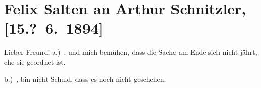 

\renewcommand{\erwaehntePersonen}{Personen: Felix Dörmann, Adele Sandrock, Johanna Simonetta Sandrock}
\renewcommand{\erwaehnteOrte}{Orte: Café Arkaden, Riedhof, Volkstheater, Wien}
\renewcommand{\erwaehnteWerke}{Werke: Anfang vom Ende, Neue Deutsche Rundschau, Therese Krones. Genrebild mit Gesang und Tanz in drei Akten}
\section[Felix Salten an Arthur Schnitzler, {[}15.? 6. 1894{]}]{Felix Salten an Arthur Schnitzler, {[}15.? 6. 1894{]}}
\nopagebreak{}
\rehead{ }\normalsize\beginnumbering{}
\toendnotes[C]{\smallbreak\pagebreak[2]}
\toendnotes[C]{\smallbreak}
\pstart{}{\pb}Lieber Freund!\pend
\pstart
           a.) \label{K_L03138-1v}\label{K_L03138-1h}, und mich bemühen, dass
               die Sache am Ende sich nicht jährt, ehe sie geordnet ist.\pend
           
\pstart
           b.) \label{K_L03138-2v}\label{K_L03138-2h}, bin
               nicht Schuld, dass es noch nicht geschehen.\pend
           
